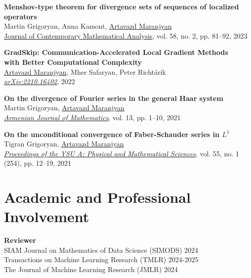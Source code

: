 \documentclass[11pt,a4paper,sans]{moderncv}        %
\begin{document}
\begin{etaremune}
\item \textbf{Menshov-type theorem for divergence sets of sequences of localized operators}\\
Martin Grigoryan, Anna Kamont, \underline{Artavazd Maranjyan}\\
\href{https://doi.org/10.3103/S106836232302005X}{Journal of Contemporary Mathematical Analysis}, vol. 58, no. 2, pp. 81–92, 2023

\item \textbf{GradSkip: Communication-Accelerated Local Gradient Methods \\ with Better Computational Complexity}\\
\underline{Artavazd Maranjyan}, Mher Safaryan, Peter Richtárik\\
\textcolor{accent}{\href{https://arxiv.org/abs/2210.16402}{\textit{arXiv:2210.16402}}}, 2022

\item \textbf{On the divergence of Fourier series in the general Haar system}\\
Martin Grigoryan, \underline{Artavazd Maranjyan}\\ \textcolor{accent}{\href{https://doi.org/10.52737/18291163-2021.13.6-1-10}{\textit{Armenian Journal of Mathematics}}}, vol. 13, pp. 1–10, 2021

\item \textbf{On the unconditional convergence of Faber-Schauder series in $L^1$}\\
Tigran Grigoryan, \underline{Artavazd Maranjyan}\\
\textcolor{accent}{\href{http://www.old.ysu.am/files/vol55\_no1\_2021\_pp12\%E2\%80\%9319.pdf}{\textit{Proceedings of the YSU A: Physical and Mathematical Sciences}}}, vol. 55, no. 1 (254), pp. 12–19, 2021
\end{etaremune}

\section{Academic and Professional Involvement}

\textbf{Reviewer}\\
SIAM Journal on Mathematics of Data Science (SIMODS) 2024\\
Transactions on Machine Learning Research (TMLR) 2024-2025\\
The Journal of Machine Learning Research (JMLR) 2024

\vspace{5pt}
\end{document}
